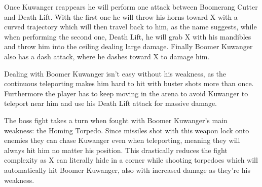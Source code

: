 Once Kuwanger reappears he will perform one attack between Boomerang Cutter and Death Lift. With the first one he will throw his horns toward X with a curved trajectory which will then travel back to him, as the name suggests, while when performing the second one, Death Lift, he will grab X with his mandibles and throw him into the ceiling dealing large damage. Finally Boomer Kuwanger also has a dash attack, where he dashes toward X to damage him.

Dealing with Boomer Kuwanger isn't easy without his weakness, as the continuous teleporting makes him hard to hit with buster shots more than once. Furthermore the player has to keep moving in the arena to avoid Kuwanger to teleport near him and use his Death Lift attack for massive damage.

The boss fight takes a turn when fought with Boomer Kuwanger's main weakness: the Homing Torpedo. Since missiles shot with this weapon lock onto enemies they can chase Kuwanger even when teleporting, meaning they will always hit him no matter his position. This drastically reduces the fight complexity as X can literally hide in a corner while shooting torpedoes which will automatically hit Boomer Kuwanger, also with increased damage as they're his weakness.


